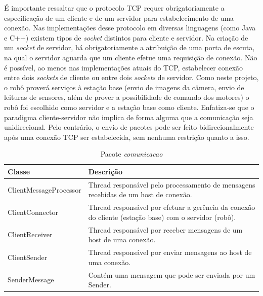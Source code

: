 É importante ressaltar que o protocolo TCP requer obrigatoriamente a especificação de um cliente e de um servidor para estabelecimento de uma conexão. Nas implementações desse protocolo em diversas linguagens (como Java e C++) existem tipos de \textit{socket} distintos para cliente e servidor. Na criação de um \textit{socket} de servidor, há obrigatoriamente a atribuição de uma porta de escuta, na qual o servidor aguarda que um cliente efetue uma requisição de conexão. Não é possível, ao menos nas implementações atuais do TCP, estabelecer conexão entre dois \textit{sockets} de cliente ou entre dois \textit{sockets} de servidor. Como neste projeto, o robô proverá serviços à estação base (envio de imagens da câmera, envio de leituras de sensores, além de prover a possibilidade de comando dos motores) o robô foi escolhido como servidor e a estação base como cliente. Enfatiza-se que o paradigma cliente-servidor não implica de forma alguma que a comunicação seja unidirecional. Pelo contrário, o envio de pacotes 
pode ser feito bidirecionalmente após uma conexão TCP ser estabelecida, sem nenhuma restrição quanto a isso.

\begin{table}[H]
  \centering
  \caption{Pacote \textit{comunicacao}}
  \begin{tabular}{p{6cm}p{8cm}}
    \toprule
    \textbf{Classe} & \textbf{Descrição} \\ 
    \midrule
    ClientMessageProcessor & Thread responsável pelo processamento de mensagens recebidas de um host de conexão. \\ \hline
    ClientConnector & Thread responsável por efetuar a gerência da conexão do cliente (estação base) com o servidor (robô). \\ \hline
    ClientReceiver & Thread responsável por receber mensagens de um host de uma conexão. \\ \hline
    ClientSender & Thread responsável por enviar mensagens ao host de uma conexão. \\ \hline
    SenderMessage & Contém uma mensagem que pode ser enviada por um Sender. \\ \hline
    \bottomrule
  \end{tabular}%
  \label{tab:pacote_comunicacao}%
\end{table}%

